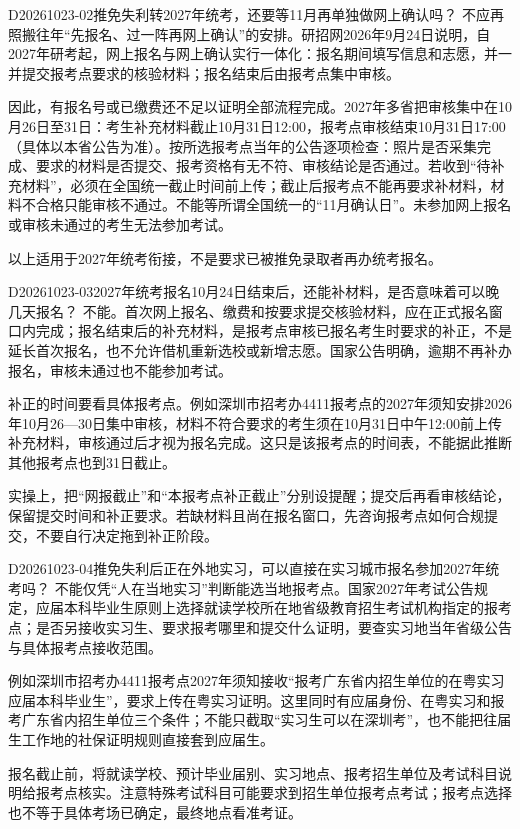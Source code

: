 \begin{qa}{D20261023-02}{推免失利转2027年统考，还要等11月再单独做网上确认吗？}
不应再照搬往年“先报名、过一阵再网上确认”的安排。研招网2026年9月24日说明，自2027年研考起，网上报名与网上确认实行一体化：报名期间填写信息和志愿，并一并提交报考点要求的核验材料；报名结束后由报考点集中审核。

因此，有报名号或已缴费还不足以证明全部流程完成。2027年多省把审核集中在10月26日至31日：考生补充材料截止10月31日12:00，报考点审核结束10月31日17:00（具体以本省公告为准）。按所选报考点当年的公告逐项检查：照片是否采集完成、要求的材料是否提交、报考资格有无不符、审核结论是否通过。若收到“待补充材料”，必须在全国统一截止时间前上传；截止后报考点不能再要求补材料，材料不合格只能审核不通过。不能等所谓全国统一的“11月确认日”。未参加网上报名或审核未通过的考生无法参加考试。

以上适用于2027年统考衔接，不是要求已被推免录取者再办统考报名。
\end{qa}

\begin{qa}{D20261023-03}{2027年统考报名10月24日结束后，还能补材料，是否意味着可以晚几天报名？}
不能。首次网上报名、缴费和按要求提交核验材料，应在正式报名窗口内完成；报名结束后的补充材料，是报考点审核已报名考生时要求的补正，不是延长首次报名，也不允许借机重新选校或新增志愿。国家公告明确，逾期不再补办报名，审核未通过也不能参加考试。

补正的时间要看具体报考点。例如深圳市招考办4411报考点的2027年须知安排2026年10月26—30日集中审核，材料不符合要求的考生须在10月31日中午12:00前上传补充材料，审核通过后才视为报名完成。这只是该报考点的时间表，不能据此推断其他报考点也到31日截止。

实操上，把“网报截止”和“本报考点补正截止”分别设提醒；提交后再看审核结论，保留提交时间和补正要求。若缺材料且尚在报名窗口，先咨询报考点如何合规提交，不要自行决定拖到补正阶段。
\end{qa}

\begin{qa}{D20261023-04}{推免失利后正在外地实习，可以直接在实习城市报名参加2027年统考吗？}
不能仅凭“人在当地实习”判断能选当地报考点。国家2027年考试公告规定，应届本科毕业生原则上选择就读学校所在地省级教育招生考试机构指定的报考点；是否另接收实习生、要求报考哪里和提交什么证明，要查实习地当年省级公告与具体报考点接收范围。

例如深圳市招考办4411报考点2027年须知接收“报考广东省内招生单位的在粤实习应届本科毕业生”，要求上传在粤实习证明。这里同时有应届身份、在粤实习和报考广东省内招生单位三个条件；不能只截取“实习生可以在深圳考”，也不能把往届生工作地的社保证明规则直接套到应届生。

报名截止前，将就读学校、预计毕业届别、实习地点、报考招生单位及考试科目说明给报考点核实。注意特殊考试科目可能要求到招生单位报考点考试；报考点选择也不等于具体考场已确定，最终地点看准考证。
\end{qa}


